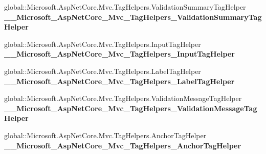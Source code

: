 \begin{DoxyCompactItemize}
\item 
\mbox{\label{class_asp_net_core_1_1_views___volunteers___edit_ad7fa5071b51765f22739fab21fdcf599}} 
global\+::\+Microsoft.\+Asp\+Net\+Core.\+Mvc.\+Tag\+Helpers.\+Validation\+Summary\+Tag\+Helper {\bfseries \+\_\+\+\_\+\+Microsoft\+\_\+\+Asp\+Net\+Core\+\_\+\+Mvc\+\_\+\+Tag\+Helpers\+\_\+\+Validation\+Summary\+Tag\+Helper}
\item 
\mbox{\label{class_asp_net_core_1_1_views___volunteers___edit_a0b229449691428c30485163fc6f44674}} 
global\+::\+Microsoft.\+Asp\+Net\+Core.\+Mvc.\+Tag\+Helpers.\+Input\+Tag\+Helper {\bfseries \+\_\+\+\_\+\+Microsoft\+\_\+\+Asp\+Net\+Core\+\_\+\+Mvc\+\_\+\+Tag\+Helpers\+\_\+\+Input\+Tag\+Helper}
\item 
\mbox{\label{class_asp_net_core_1_1_views___volunteers___edit_a07c9c16d05a7cb9fdfac0c1dde0adb5c}} 
global\+::\+Microsoft.\+Asp\+Net\+Core.\+Mvc.\+Tag\+Helpers.\+Label\+Tag\+Helper {\bfseries \+\_\+\+\_\+\+Microsoft\+\_\+\+Asp\+Net\+Core\+\_\+\+Mvc\+\_\+\+Tag\+Helpers\+\_\+\+Label\+Tag\+Helper}
\item 
\mbox{\label{class_asp_net_core_1_1_views___volunteers___edit_a9671b7bf65dbcc8ff924ebed8fc10e78}} 
global\+::\+Microsoft.\+Asp\+Net\+Core.\+Mvc.\+Tag\+Helpers.\+Validation\+Message\+Tag\+Helper {\bfseries \+\_\+\+\_\+\+Microsoft\+\_\+\+Asp\+Net\+Core\+\_\+\+Mvc\+\_\+\+Tag\+Helpers\+\_\+\+Validation\+Message\+Tag\+Helper}
\item 
\mbox{\label{class_asp_net_core_1_1_views___volunteers___edit_a0fb71bf351f3acc8b19dce923eeff4c5}} 
global\+::\+Microsoft.\+Asp\+Net\+Core.\+Mvc.\+Tag\+Helpers.\+Anchor\+Tag\+Helper {\bfseries \+\_\+\+\_\+\+Microsoft\+\_\+\+Asp\+Net\+Core\+\_\+\+Mvc\+\_\+\+Tag\+Helpers\+\_\+\+Anchor\+Tag\+Helper}
\end{DoxyCompactItemize}
